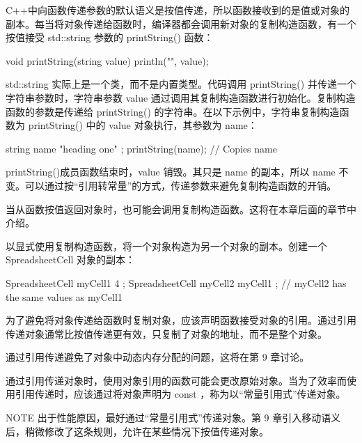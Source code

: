 
C++中向函数传递参数的默认语义是按值传递，所以函数接收到的是值或对象的副本。每当将对象传递给函数时，编译器都会调用新对象的复制构造函数，有一个按值接受 std::string 参数的 printString() 函数：

\begin{cpp}
void printString(string value)
{
    println("{}", value);
}
\end{cpp}

std::string 实际上是一个类，而不是内置类型。代码调用 printString() 并传递一个字符串参数时，字符串参数 value 通过调用其复制构造函数进行初始化。复制构造函数的参数是传递给 printString() 的字符串。在以下示例中，字符串复制构造函数为 printString() 中的 value 对象执行，其参数为 name：

\begin{cpp}
string name { "heading one" };
printString(name); // Copies name
\end{cpp}

printString()成员函数结束时，value 销毁。其只是 name 的副本，所以 name 不变。可以通过按“引用转常量”的方式，传递参数来避免复制构造函数的开销。

当从函数按值返回对象时，也可能会调用复制构造函数。这将在本章后面的章节中介绍。


以显式使用复制构造函数，将一个对象构造为另一个对象的副本。创建一个 SpreadsheetCell 对象的副本：

\begin{cpp}
SpreadsheetCell myCell1 { 4 };
SpreadsheetCell myCell2 { myCell1 }; // myCell2 has the same values as myCell1
\end{cpp}


为了避免将对象传递给函数时复制对象，应该声明函数接受对象的引用。通过引用传递对象通常比按值传递更有效，只复制了对象的地址，而不是整个对象。

通过引用传递避免了对象中动态内存分配的问题，这将在第 9 章讨论。

通过引用传递对象时，使用对象引用的函数可能会更改原始对象。当为了效率而使用引用传递时，应该通过将对象声明为 const ，称为以“常量引用式”传递对象。

\begin{myNotic}{NOTE}
出于性能原因，最好通过“常量引用式”传递对象。第 9 章引入移动语义后，稍微修改了这条规则，允许在某些情况下按值传递对象。
\end{myNotic}

